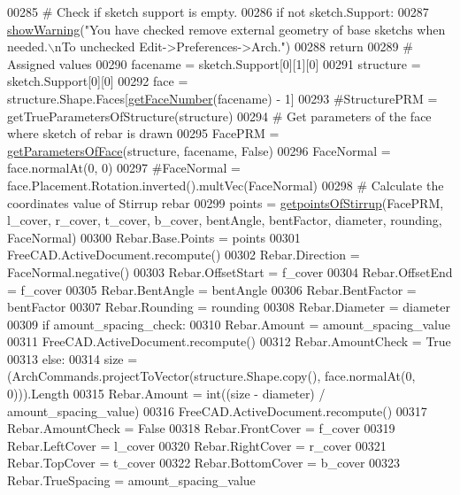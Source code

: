 \begin{DoxyCode}
00285     \textcolor{comment}{# Check if sketch support is empty.}
00286     \textcolor{keywordflow}{if} \textcolor{keywordflow}{not} sketch.Support:
00287         \hyperlink{namespaceRebarfunc_a2278a0602d46a62953af1fcf2e574a94}{showWarning}(\textcolor{stringliteral}{"You have checked remove external geometry of base sketchs when needed.\(\backslash\)nTo
       unchecked Edit->Preferences->Arch."})
00288         \textcolor{keywordflow}{return}
00289     \textcolor{comment}{# Assigned values}
00290     facename = sketch.Support[0][1][0]
00291     structure = sketch.Support[0][0]
00292     face = structure.Shape.Faces[\hyperlink{namespaceRebarfunc_a3885b3b63e3a41508ac79bc7550cf301}{getFaceNumber}(facename) - 1]
00293     \textcolor{comment}{#StructurePRM = getTrueParametersOfStructure(structure)}
00294     \textcolor{comment}{# Get parameters of the face where sketch of rebar is drawn}
00295     FacePRM = \hyperlink{namespaceRebarfunc_a92122b3d7cedd3d47bb63380a5ac4d08}{getParametersOfFace}(structure, facename, \textcolor{keyword}{False})
00296     FaceNormal = face.normalAt(0, 0)
00297     \textcolor{comment}{#FaceNormal = face.Placement.Rotation.inverted().multVec(FaceNormal)}
00298     \textcolor{comment}{# Calculate the coordinates value of Stirrup rebar}
00299     points = \hyperlink{namespaceStirrup_aa6df5118806bfe9d3a799e1bf549bb0a}{getpointsOfStirrup}(FacePRM, l\_cover, r\_cover, t\_cover, b\_cover, bentAngle, 
      bentFactor, diameter, rounding, FaceNormal)
00300     Rebar.Base.Points = points
00301     FreeCAD.ActiveDocument.recompute()
00302     Rebar.Direction = FaceNormal.negative()
00303     Rebar.OffsetStart = f\_cover
00304     Rebar.OffsetEnd = f\_cover
00305     Rebar.BentAngle = bentAngle
00306     Rebar.BentFactor = bentFactor
00307     Rebar.Rounding = rounding
00308     Rebar.Diameter = diameter
00309     \textcolor{keywordflow}{if} amount\_spacing\_check:
00310         Rebar.Amount = amount\_spacing\_value
00311         FreeCAD.ActiveDocument.recompute()
00312         Rebar.AmountCheck = \textcolor{keyword}{True}
00313     \textcolor{keywordflow}{else}:
00314         size = (ArchCommands.projectToVector(structure.Shape.copy(), face.normalAt(0, 0))).Length
00315         Rebar.Amount = int((size - diameter) / amount\_spacing\_value)
00316         FreeCAD.ActiveDocument.recompute()
00317         Rebar.AmountCheck = \textcolor{keyword}{False}
00318     Rebar.FrontCover = f\_cover
00319     Rebar.LeftCover = l\_cover
00320     Rebar.RightCover = r\_cover
00321     Rebar.TopCover = t\_cover
00322     Rebar.BottomCover = b\_cover
00323     Rebar.TrueSpacing = amount\_spacing\_value

\end{DoxyCode}
